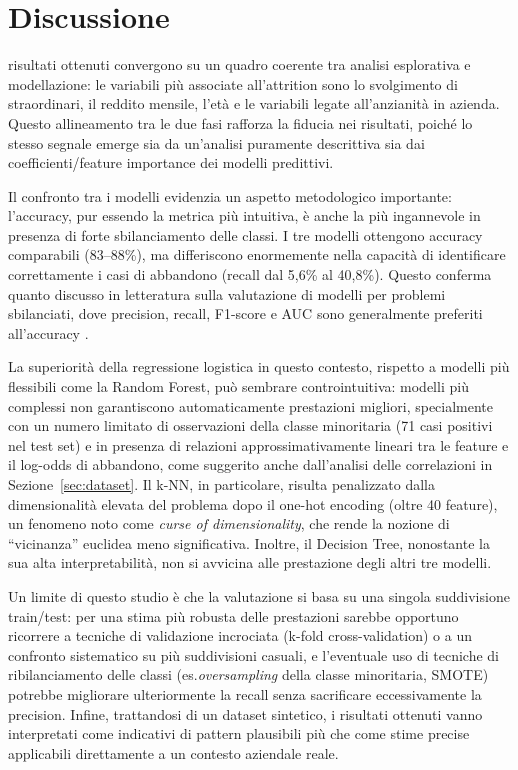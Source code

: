 \documentclass[9pt,a4paper,twocolumn,twoside]{tau-class/tau}
\begin{document}
\section{Discussione}
\label{sec:discussione}

 risultati ottenuti convergono su un quadro coerente tra analisi esplorativa e modellazione: le variabili più associate all'attrition sono lo svolgimento di straordinari, il reddito mensile, l'età e le variabili legate all'anzianità in azienda. Questo allineamento tra le due fasi rafforza la fiducia nei risultati, poiché lo stesso segnale emerge sia da un'analisi puramente descrittiva sia dai coefficienti/feature importance dei modelli predittivi.

Il confronto tra i modelli evidenzia un aspetto metodologico importante: l'accuracy, pur essendo la metrica più intuitiva, è anche la più ingannevole in presenza di forte sbilanciamento delle classi. I tre modelli ottengono accuracy comparabili (83--88\%), ma differiscono enormemente nella capacità di identificare correttamente i casi di abbandono (recall dal 5,6\% al 40,8\%). Questo conferma quanto discusso in letteratura sulla valutazione di modelli per problemi sbilanciati, dove precision, recall, F1-score e AUC sono generalmente preferiti all'accuracy \cite{he2009imbalanced}.

La superiorità della regressione logistica in questo contesto, rispetto a modelli più flessibili come la Random Forest, può sembrare controintuitiva: modelli più complessi non garantiscono automaticamente prestazioni migliori, specialmente con un numero limitato di osservazioni della classe minoritaria (71 casi positivi nel test set) e in presenza di relazioni approssimativamente lineari tra le feature e il log-odds di abbandono, come suggerito anche dall'analisi delle correlazioni in Sezione~\ref{sec:dataset}.
Il k-NN, in particolare, risulta penalizzato dalla dimensionalità elevata del problema dopo il one-hot encoding (oltre 40 feature), un fenomeno noto come \emph{curse of dimensionality}, che rende la nozione di ``vicinanza'' euclidea meno significativa. Inoltre, il Decision Tree, nonostante la sua alta interpretabilità, non si avvicina alle prestazione degli altri tre modelli.

Un limite di questo studio è che la valutazione si basa su una singola suddivisione train/test: per una stima più robusta delle prestazioni sarebbe opportuno ricorrere a tecniche di validazione incrociata (k-fold cross-validation) o a un confronto sistematico su più suddivisioni casuali, e l'eventuale uso di tecniche di ribilanciamento delle classi (es.\emph{oversampling} della classe minoritaria, SMOTE) potrebbe migliorare ulteriormente la recall senza sacrificare eccessivamente la precision. Infine, trattandosi di un dataset sintetico, i risultati ottenuti vanno interpretati come indicativi di pattern plausibili più che come stime precise applicabili direttamente a un contesto aziendale reale.
\end{document}
